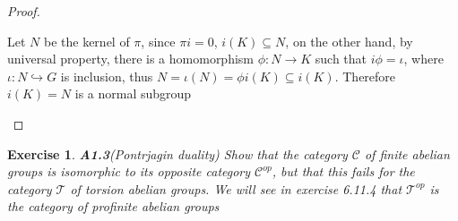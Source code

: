 \documentclass{article}
\newtheorem*{exercise}{Exercise}
\theoremstyle{definition}
\theoremstyle{remark}
\theoremstyle{definition}
\begin{document}
\begin{proof}
\begin{center}
\end{center}
Let $N$ be the kernel of $\pi$, since $\pi i=0$, $i(K)\subseteq N$, on the other hand, by universal property, there is a homomorphism $\phi:N\to K$ such that $i\phi=\iota$, where $\iota:N\hookrightarrow G$ is inclusion, thus $N=\iota(N)=\phi i(K)\subseteq i(K)$. Therefore $i(K)=N$ is a normal subgroup
\begin{center}
\end{center}
\end{proof}

\begin{exercise}{\textbf{A1.3}}(Pontrjagin duality)
Show that the category $\mathcal C$ of finite abelian groups is isomorphic to its opposite category $\mathcal C^{op}$, but that this fails for the category $\mathcal T$ of torsion abelian groups. We will see in exercise 6.11.4 that $\mathcal T^{op}$ is the category of profinite abelian groups
\end{exercise}
\end{document}
